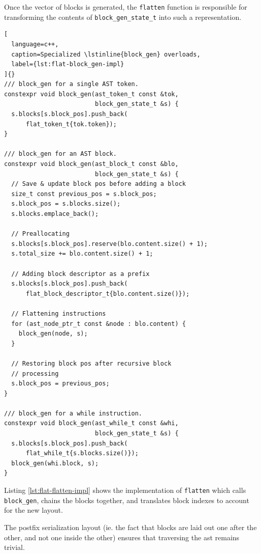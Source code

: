 \documentclass[../main]{subfiles}
\begin{document}
Once the vector of blocks is generated, the \lstinline{flatten} function
is responsible for transforming the contents of \lstinline{block_gen_state_t}
into such a representation.

\clearpage%

\begin{lstlisting}[
  language=c++,
  caption=Specialized \lstinline{block_gen} overloads,
  label={lst:flat-block_gen-impl}
]{}
/// block_gen for a single AST token.
constexpr void block_gen(ast_token_t const &tok,
                         block_gen_state_t &s) {
  s.blocks[s.block_pos].push_back(
      flat_token_t{tok.token});
}

/// block_gen for an AST block.
constexpr void block_gen(ast_block_t const &blo,
                         block_gen_state_t &s) {
  // Save & update block pos before adding a block
  size_t const previous_pos = s.block_pos;
  s.block_pos = s.blocks.size();
  s.blocks.emplace_back();

  // Preallocating
  s.blocks[s.block_pos].reserve(blo.content.size() + 1);
  s.total_size += blo.content.size() + 1;

  // Adding block descriptor as a prefix
  s.blocks[s.block_pos].push_back(
      flat_block_descriptor_t{blo.content.size()});

  // Flattening instructions
  for (ast_node_ptr_t const &node : blo.content) {
    block_gen(node, s);
  }

  // Restoring block pos after recursive block
  // processing
  s.block_pos = previous_pos;
}

/// block_gen for a while instruction.
constexpr void block_gen(ast_while_t const &whi,
                         block_gen_state_t &s) {
  s.blocks[s.block_pos].push_back(
      flat_while_t{s.blocks.size()});
  block_gen(whi.block, s);
}
\end{lstlisting}

Listing \ref{lst:flat-flatten-impl} shows the implementation of
\lstinline{flatten} which calls \lstinline{block_gen},
chains the blocks together, and translates block indexes to account for
the new layout.

The postfix serialization layout (ie. the fact that blocks are laid out
one after the other, and not one inside the other) ensures that
traversing the \gls{ast} remains trivial.

\clearpage%
\end{document}
